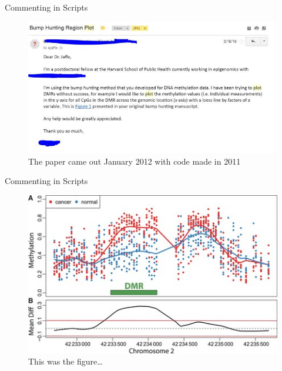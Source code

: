 \documentclass[
  ignorenonframetext,
]{beamer}
\begin{document}
\begin{frame}{Commenting in Scripts}
\protect\hypertarget{commenting-in-scripts-1}{}

\begin{figure}
\centering
\includegraphics{media/code_request.jpg}
\caption{The paper came out January 2012 with code made in 2011}
\end{figure}

\end{frame}

\begin{frame}{Commenting in Scripts}
\protect\hypertarget{commenting-in-scripts-2}{}

\begin{figure}
\centering
\includegraphics{media/dyr238f1.jpg}
\caption{This was the figure\ldots{}}
\end{figure}

\end{frame}
\end{document}
